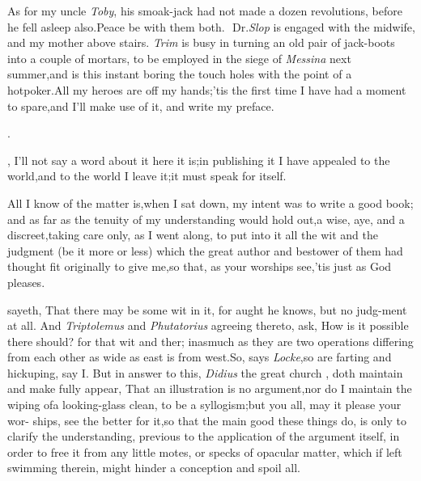 \documentclass{article}
\begin{document}
As for my uncle \textit{Toby}, his smoak-jack
had not made a dozen revolutions, before
he fell asleep also.\tsh Peace be with
them both.\,\tsk\, Dr.\@ \textit{Slop} is engaged with the
midwife,
and my mother above stairs.\tsk\break
\textit{Trim} is busy in turning an old pair of jack-boots
into a couple of mortars, to be employed in the siege of
\textit{Messina} next summer,\tsk and is this instant boring
the touch holes with the point of a hot\break poker.\tsh All
my heroes are off my hands;\tsh ’tis the first time I have
had a moment to spare,\tsk and I’ll make use of it, and
write my preface.  \vfil {}

\newpage
\null\smallskip
\centerline{}
\bigskip
\centerline{\Large{}.}
\bigskip

, I’ll not say a word about it\tsk\break
here it is;\tsk in publishing it\tsk\break
I have appealed to the world,\tsh and to the world I leave
it;\tsk it must speak for itself.

All I know of the matter is,\tsk when I sat down, my intent was
to write a good book; and as far as the tenuity of my understanding
would hold out,\tsk a wise, aye, and a discreet,\tsk taking care
only, as I went along, to put into it all the wit and the judgment
(be it more or less) which the great author and bestower of them
had thought fit originally to give
me,\tsh so that, as your
worships see,\tsk ’tis just as God pleases.

\noindent
{}
sayeth, That there may be some wit in it, for aught he
knows,\tsk
but no judg-\break ment at all. And \textit{Triptolemus} and \textit{Phutatorius}
agreeing thereto, ask, How is it possible there should?
for that wit and
ther;  inasmuch as they are two operations differing
from each other as wide as east is from west.\tsk So, says
\textit{Locke},\tsk so are farting and hickuping, say I. But
in answer to this, \textit{Didius} the great church \break{}, doth maintain and
make fully appear, That an illustration is no
argument,\tsk nor do I maintain the wiping of\break a
looking-glass clean, to be a syllogism;\break\tsk but you all, may it
please your wor- ships, see the better for it,\tsh so that
the main good these things do, is only to clarify the understanding,
previous to the application of the argument itself, in order to
free it from any little motes, or specks of opacular matter, which
if left swimming therein, might hinder a conception and spoil
all.
\end{document}
